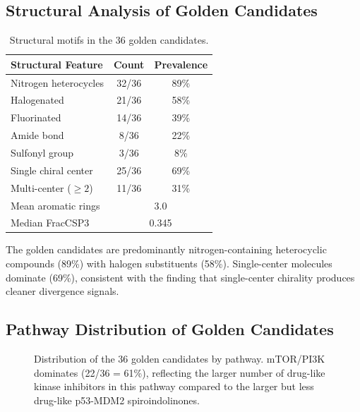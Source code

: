 \documentclass[11pt,a4paper]{article}
\begin{document}
\subsection{Structural Analysis of Golden Candidates}

\begin{table}[H]
\centering
\caption{Structural motifs in the 36 golden candidates.}
\label{tab:motifs}
\begin{tabular}{@{}lcc@{}}
\toprule
\textbf{Structural Feature} & \textbf{Count} & \textbf{Prevalence} \\
\midrule
Nitrogen heterocycles       & 32/36 & 89\% \\
Halogenated                 & 21/36 & 58\% \\
Fluorinated                 & 14/36 & 39\% \\
Amide bond                  &  8/36 & 22\% \\
Sulfonyl group              &  3/36 &  8\% \\
\midrule
Single chiral center        & 25/36 & 69\% \\
Multi-center ($\geq 2$)     & 11/36 & 31\% \\
\midrule
Mean aromatic rings         & \multicolumn{2}{c}{3.0} \\
Median FracCSP3             & \multicolumn{2}{c}{0.345} \\
\bottomrule
\end{tabular}
\end{table}

\noindent The golden candidates are predominantly nitrogen-containing
heterocyclic compounds (89\%) with halogen substituents (58\%).
Single-center molecules dominate (69\%), consistent with the finding
that single-center chirality produces cleaner divergence signals.

\subsection{Pathway Distribution of Golden Candidates}

\begin{figure}[H]
\centering
{}
\caption{Distribution of the 36 golden candidates by pathway.
mTOR/PI3K dominates (22/36 = 61\%), reflecting the larger number of
drug-like kinase inhibitors in this pathway compared to the larger
but less drug-like p53-MDM2 spiroindolinones.}
\label{fig:golden_dist}
\end{figure}
\end{document}
